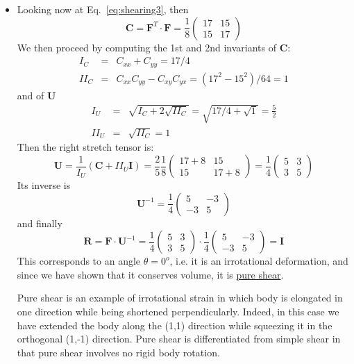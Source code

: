 \begin{itemize}
\item
Looking now at Eq.~\eqref{eq:shearing3}, then
\[
{\bm C} = {\bm F}^T\cdot{\bm F}
=
\frac{1}{8}
\left(
\begin{array}{cc}
17 & 15 \\
15 & 17
\end{array}
\right)
\]
We then proceed by computing the 1st and 2nd invariants of ${\bm C}$:
\begin{eqnarray}
I_C &=&C_{xx}+C_{yy} = 17/4\\
II_C&=&C_{xx}C_{yy}-C_{xy}C_{yx} = (17^2-15^2)/64 = 1
\end{eqnarray}
and of ${\bm U}$
\begin{eqnarray}
I_U &=&\sqrt{I_C + 2 \sqrt{II_C}} = \sqrt{ 17/4 + \sqrt{1}  } = \frac{5}{2}\\
II_U&=&\sqrt{II_C} = 1
\end{eqnarray}
Then the right stretch tensor is:
\[
{\bm U} = \frac{1}{I_U}({\bm C} + II_U {\bm I})
=
\frac{2}{5}
\frac{1}{8}
\left(
\begin{array}{cc}
17+8 & 15 \\
15 & 17+8
\end{array}
\right)
=
\frac{1}{4}
\left(
\begin{array}{cc}
5 & 3 \\
3 & 5
\end{array}
\right)
\]
Its inverse is 
\[
{\bm U}^{-1}
=
\frac{1}{4}
\left(
\begin{array}{cc}
5 & -3 \\
-3 & 5
\end{array}
\right)
\]
and finally 
\[
{\bm R}= {\bm F} \cdot {\bm U}^{-1}
=
\frac{1}{4}
\left(
\begin{array}{cc}
5 & 3 \\
3 & 5
\end{array}
\right)
\cdot
\frac{1}{4}
\left(
\begin{array}{cc}
5 & -3 \\
-3 & 5
\end{array}
\right)
={\bm I}
\]
This corresponds to an angle $\theta=0^o$, i.e. it is an irrotational deformation, and since
we have shown that it conserves volume, it is \underline{pure shear}.

Pure shear is an example of irrotational strain in which body is elongated in one direction 
while being shortened perpendicularly. Indeed, in this case we have extended the body 
along the (1,1) direction while squeezing it in the orthogonal (1,-1) direction.
Pure shear is differentiated from simple shear in that pure shear involves no rigid body rotation. 

\end{itemize}



